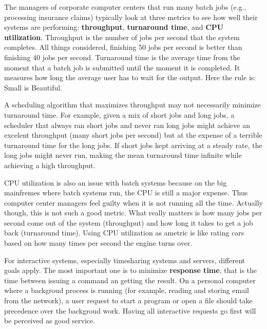 \documentclass{book}
\newcommand {\kw}  [1] {\textbf{#1}}
\begin{document}
The managers of corporate computer centers that run many batch jobs (e.g., processing insurance claims) typically 
look at three metrics to see how well their systems are performing:
\kw{throughput}, \kw{turnaround time}, and \kw{CPU utilization}.
Throughput is the number of jobs per second that the system completes.
All things considered, finishing 50 jobs per second is better than finishing 40 jobs per second.
Turnaround time is the average time from the moment that a batch job is submitted until the moment it is completed.
It measures how long the average user has to wait for the output.
Here the rule is: Small is Beautiful.

A scheduling algorithm that maximizes throughput may not necessarily minimize turnaround time.
For example, given a mix of short jobs and long jobs, 
a scheduler that always ran short jobs and never ran long jobs might achieve an excelent throughput (many short jobs per second) 
but at the expense of a terrible turnaround time for the long jobs.
If short jobs kept arriving at a steady rate, the long jobs might never run, 
making the mean turnaround time infinite while achieving a high throughput.

CPU utilization is also an issue with batch systems because on the big mainfremes where batch systems run,
the CPU is still a major expense.
Thus computer center managers feel guilty when it is not running all the time.
Actually though, this is not such a good metric.
What really matters is how many jobs per second come out of the system (throughput) and how long it takes to get a job back (turnaround time).
Using CPU utilization as ametric is like rating cars based on how many times per second the engine turns over.

For interactive systems, especially timesharing systems and servers, different goals apply.
The most important one is to minimize \kw{response time}, that is the time between issuing a command an getting the result. 
On a personal computer where a backgroud process is running (for example, reading and storing email from the network),
a user request to start a program or open a file should take precedence over the backgroud work.
Having all interactive requests go first will be perceived as good service.
\end{document}
